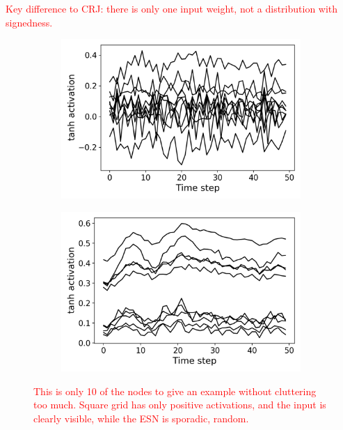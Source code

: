 \textcolor{red}{
  Key difference to CRJ: there is only one input weight, not a distribution with
signedness.
}

\begin{figure}[t]
  \centering
  \begin{subfigure}{.49\textwidth}
    \centering
    \includegraphics[width=1.0\linewidth]{figures/esn-activations.png}
    \caption{}
    \label{fig:activations-a}
  \end{subfigure}
  \begin{subfigure}{.49\textwidth}
    \centering
    \includegraphics[width=1.0\linewidth]{figures/sq-activations.png}
    \caption{}
    \label{fig:activations-b}
  \end{subfigure}
  \caption{
    \textcolor{red}{
      This is only 10 of the nodes to give an example without cluttering too
much. Square grid has only positive activations, and the input is clearly
visible, while the ESN is sporadic, random.
    }
  }
  \label{fig:activations}
\end{figure}

